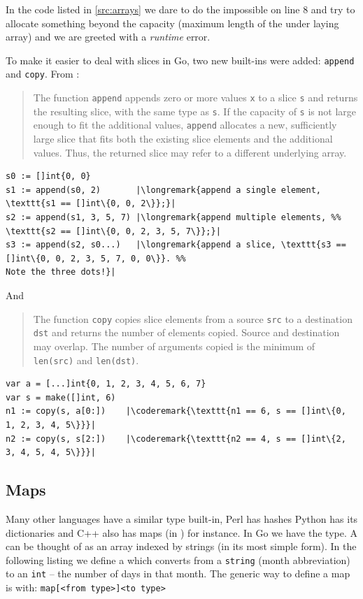 In the code listed in \ref{src:arrays} we dare to do the impossible on
line 8 and try to allocate something
beyond the capacity (maximum length of the under laying array) and
we are greeted with a \emph{runtime} error.

To make it easier to deal with slices in Go, two new built-ins were
added: \lstinline{append} and \lstinline{copy}. From \cite{go_spec}:
\begin{quote}
The function \lstinline{append} appends zero or more values \lstinline{x} to a
slice \lstinline{s} and returns the resulting slice, with the same type as
\lstinline{s}.
If the capacity of \lstinline{s} is not large enough to fit the additional values,
\lstinline{append} allocates a new, sufficiently large slice that fits both the
existing slice elements and the additional values. Thus, the returned
slice may refer to a different underlying array.
\end{quote}
\begin{lstlisting}
s0 := []int{0, 0}
s1 := append(s0, 2)       |\longremark{append a single element, \texttt{s1 == []int\{0, 0, 2\}};}|
s2 := append(s1, 3, 5, 7) |\longremark{append multiple elements, %% 
\texttt{s2 == []int\{0, 0, 2, 3, 5, 7\}};}|
s3 := append(s2, s0...)   |\longremark{append a slice, \texttt{s3 == []int\{0, 0, 2, 3, 5, 7, 0, 0\}}. %%
Note the three dots!}|
\end{lstlisting}
\showremarks
And
\begin{quote}
The function \lstinline{copy} copies slice elements from a source
\lstinline{src} to a
destination \lstinline{dst} and returns the number of elements copied. Source and
destination may overlap. The number of arguments
copied is the minimum of \lstinline{len(src)} and
\mbox{\lstinline{len(dst)}}.
\end{quote}
\begin{lstlisting}
var a = [...]int{0, 1, 2, 3, 4, 5, 6, 7}
var s = make([]int, 6)
n1 := copy(s, a[0:])    |\coderemark{\texttt{n1 == 6, s == []int\{0, 1, 2, 3, 4, 5\}}}|
n2 := copy(s, s[2:])    |\coderemark{\texttt{n2 == 4, s == []int\{2, 3, 4, 5, 4, 5\}}}|
\end{lstlisting}

\subsection{Maps}
\label{sec:maps}
Many other languages have a similar type built-in, Perl has hashes
Python has its dictionaries and C++ also has maps (in
) for instance. 
In Go we have the
 type. A  can be thought of as an array indexed by
strings (in its most simple form).
In the following listing we define a  which converts from a
\lstinline{string} (month abbreviation) to an \lstinline{int} -- the number of days in that month. 
The generic way to define a map is with: \verb|map[<from type>]<to type>|

